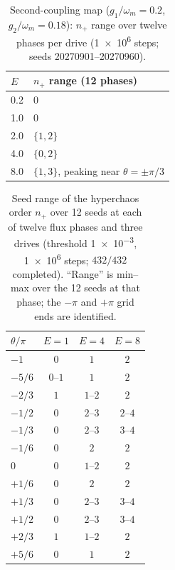 \documentclass[preprint,numbers,a4paper]{elsarticle}
\begin{document}
\begin{table}[h]
  \centering
  \caption{Second-coupling map ($g_1/\omega_m=\num{0.2}$, $g_2/\omega_m=\num{0.18}$): $n_{+}$ range over twelve phases per drive (\num{1e6} steps; seeds \num{20270901}--\num{20270960}).}
  \label{SI-tab:si-second-coupling}
  \begin{tabular}{@{}ll@{}}
    \toprule
    $E$ & $n_{+}$ range (12 phases) \\
    \midrule
    \num{0.2} & \num{0} \\
    \num{1.0} & \num{0} \\
    \num{2.0} & $\{1,2\}$ \\
    \num{4.0} & $\{0,2\}$ \\
    \num{8.0} & $\{1,3\}$, peaking near $\theta=\pm\pi/3$ \\
    \bottomrule
  \end{tabular}
\end{table}

\begin{table}[h]
  \centering
  \caption{Seed range of the hyperchaos order $n_{+}$ over \num{12} seeds at each of twelve flux phases and three drives (threshold \num{1e-3}, \num{1e6} steps; $\num{432}/\num{432}$ completed). ``Range'' is min--max over the \num{12} seeds at that phase; the $-\pi$ and $+\pi$ grid ends are identified.}
  \label{SI-tab:si-twelve-seed}
  \small
  \begin{tabular}{@{}lccc@{}}
    \toprule
    $\theta/\pi$ & $E=1$ & $E=4$ & $E=8$ \\
    \midrule
    $-1$    & $0$   & $1$   & $2$   \\
    $-5/6$  & $0$--$1$ & $1$   & $2$   \\
    $-2/3$  & $1$   & $1$--$2$ & $2$   \\
    $-1/2$  & $0$   & $2$--$3$ & $2$--$4$ \\
    $-1/3$  & $0$   & $2$--$3$ & $3$--$4$ \\
    $-1/6$  & $0$   & $2$   & $2$   \\
    $0$     & $0$   & $1$--$2$ & $2$   \\
    $+1/6$  & $0$   & $2$   & $2$   \\
    $+1/3$  & $0$   & $2$--$3$ & $3$--$4$ \\
    $+1/2$  & $0$   & $2$--$3$ & $3$--$4$ \\
    $+2/3$  & $1$   & $1$--$2$ & $2$   \\
    $+5/6$  & $0$   & $1$   & $2$   \\
    \bottomrule
  \end{tabular}
\end{table}
\end{document}
